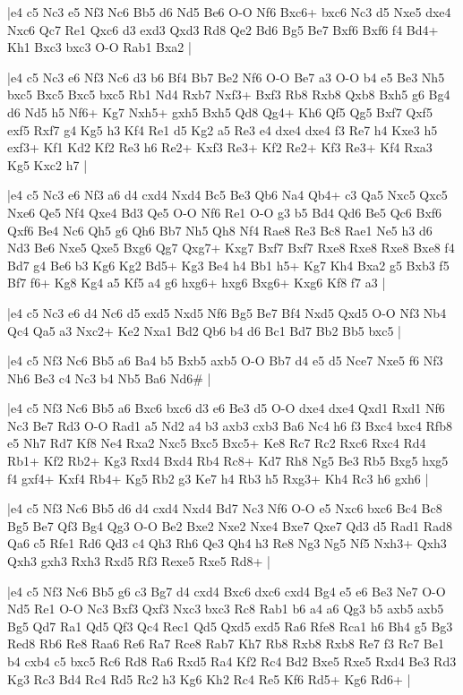 \whitename{}
\blackname{}
\makegametitle
|e4 c5 Nc3 e5 Nf3 Nc6 Bb5 d6 Nd5 Be6 O-O Nf6 Bxc6+ bxc6 Nc3 d5 Nxe5 dxe4 Nxc6 Qc7 Re1 Qxc6 d3 exd3 Qxd3 Rd8 Qe2 Bd6 Bg5 Be7 Bxf6 Bxf6 f4 Bd4+ Kh1 Bxc3 bxc3 O-O Rab1 Bxa2  |

\whitename{}
\blackname{}
\makegametitle
|e4 c5 Nc3 e6 Nf3 Nc6 d3 b6 Bf4 Bb7 Be2 Nf6 O-O Be7 a3 O-O b4 e5 Be3 Nh5 bxc5 Bxc5 Bxc5 bxc5 Rb1 Nd4 Rxb7 Nxf3+ Bxf3 Rb8 Rxb8 Qxb8 Bxh5 g6 Bg4 d6 Nd5 h5 Nf6+ Kg7 Nxh5+ gxh5 Bxh5 Qd8 Qg4+ Kh6 Qf5 Qg5 Bxf7 Qxf5 exf5 Rxf7 g4 Kg5 h3 Kf4 Re1 d5 Kg2 a5 Re3 e4 dxe4 dxe4 f3 Re7 h4 Kxe3 h5 exf3+ Kf1 Kd2 Kf2 Re3 h6 Re2+ Kxf3 Re3+ Kf2 Re2+ Kf3 Re3+ Kf4 Rxa3 Kg5 Kxc2 h7  |

\whitename{}
\blackname{}
\makegametitle
|e4 c5 Nc3 e6 Nf3 a6 d4 cxd4 Nxd4 Bc5 Be3 Qb6 Na4 Qb4+ c3 Qa5 Nxc5 Qxc5 Nxe6 Qe5 Nf4 Qxe4 Bd3 Qe5 O-O Nf6 Re1 O-O g3 b5 Bd4 Qd6 Be5 Qc6 Bxf6 Qxf6 Be4 Nc6 Qh5 g6 Qh6 Bb7 Nh5 Qh8 Nf4 Rae8 Re3 Bc8 Rae1 Ne5 h3 d6 Nd3 Be6 Nxe5 Qxe5 Bxg6 Qg7 Qxg7+ Kxg7 Bxf7 Bxf7 Rxe8 Rxe8 Rxe8 Bxe8 f4 Bd7 g4 Be6 b3 Kg6 Kg2 Bd5+ Kg3 Be4 h4 Bb1 h5+ Kg7 Kh4 Bxa2 g5 Bxb3 f5 Bf7 f6+ Kg8 Kg4 a5 Kf5 a4 g6 hxg6+ hxg6 Bxg6+ Kxg6 Kf8 f7 a3  |

\whitename{}
\blackname{}
\makegametitle
|e4 c5 Nc3 e6 d4 Nc6 d5 exd5 Nxd5 Nf6 Bg5 Be7 Bf4 Nxd5 Qxd5 O-O Nf3 Nb4 Qc4 Qa5 a3 Nxc2+ Ke2 Nxa1 Bd2 Qb6 b4 d6 Bc1 Bd7 Bb2 Bb5 bxc5  |

\whitename{}
\blackname{}
\makegametitle
|e4 c5 Nf3 Nc6 Bb5 a6 Ba4 b5 Bxb5 axb5 O-O Bb7 d4 e5 d5 Nce7 Nxe5 f6 Nf3 Nh6 Be3 c4 Nc3 b4 Nb5 Ba6 Nd6\#  |

\whitename{}
\blackname{}
\makegametitle
|e4 c5 Nf3 Nc6 Bb5 a6 Bxc6 bxc6 d3 e6 Be3 d5 O-O dxe4 dxe4 Qxd1 Rxd1 Nf6 Nc3 Be7 Rd3 O-O Rad1 a5 Nd2 a4 b3 axb3 cxb3 Ba6 Nc4 h6 f3 Bxc4 bxc4 Rfb8 e5 Nh7 Rd7 Kf8 Ne4 Rxa2 Nxc5 Bxc5 Bxc5+ Ke8 Rc7 Rc2 Rxc6 Rxc4 Rd4 Rb1+ Kf2 Rb2+ Kg3 Rxd4 Bxd4 Rb4 Rc8+ Kd7 Rh8 Ng5 Be3 Rb5 Bxg5 hxg5 f4 gxf4+ Kxf4 Rb4+ Kg5 Rb2 g3 Ke7 h4 Rb3 h5 Rxg3+ Kh4 Rc3 h6 gxh6  |

\whitename{}
\blackname{}
\makegametitle
|e4 c5 Nf3 Nc6 Bb5 d6 d4 cxd4 Nxd4 Bd7 Nc3 Nf6 O-O e5 Nxc6 bxc6 Bc4 Bc8 Bg5 Be7 Qf3 Bg4 Qg3 O-O Be2 Bxe2 Nxe2 Nxe4 Bxe7 Qxe7 Qd3 d5 Rad1 Rad8 Qa6 c5 Rfe1 Rd6 Qd3 c4 Qh3 Rh6 Qe3 Qh4 h3 Re8 Ng3 Ng5 Nf5 Nxh3+ Qxh3 Qxh3 gxh3 Rxh3 Rxd5 Rf3 Rexe5 Rxe5 Rd8+  |

\whitename{}
\blackname{}
\makegametitle
|e4 c5 Nf3 Nc6 Bb5 g6 c3 Bg7 d4 cxd4 Bxc6 dxc6 cxd4 Bg4 e5 e6 Be3 Ne7 O-O Nd5 Re1 O-O Nc3 Bxf3 Qxf3 Nxc3 bxc3 Rc8 Rab1 b6 a4 a6 Qg3 b5 axb5 axb5 Bg5 Qd7 Ra1 Qd5 Qf3 Qc4 Rec1 Qd5 Qxd5 exd5 Ra6 Rfe8 Rca1 h6 Bh4 g5 Bg3 Red8 Rb6 Re8 Raa6 Re6 Ra7 Rce8 Rab7 Kh7 Rb8 Rxb8 Rxb8 Re7 f3 Rc7 Be1 b4 cxb4 c5 bxc5 Rc6 Rd8 Ra6 Rxd5 Ra4 Kf2 Rc4 Bd2 Bxe5 Rxe5 Rxd4 Be3 Rd3 Kg3 Rc3 Bd4 Rc4 Rd5 Rc2 h3 Kg6 Kh2 Rc4 Re5 Kf6 Rd5+ Kg6 Rd6+  |

